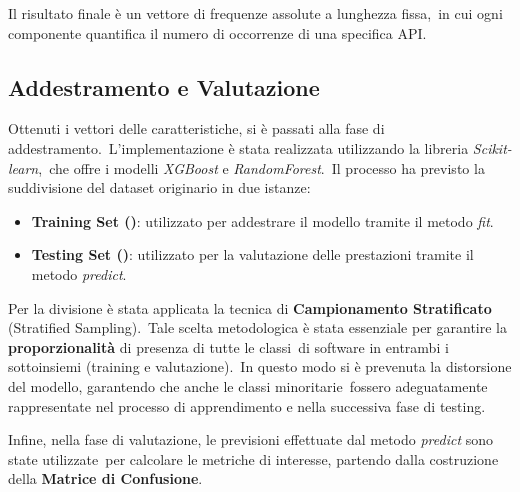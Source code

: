 Il risultato finale è un vettore di frequenze assolute a lunghezza fissa,\
in cui ogni componente quantifica il numero di occorrenze di una specifica API.

\subsection{Addestramento e Valutazione}

Ottenuti i vettori delle caratteristiche, si è passati alla fase di addestramento.\
L'implementazione è stata realizzata utilizzando la libreria \textit{Scikit-learn},\
che offre i modelli \textit{XGBoost} e \textit{RandomForest}.\
Il processo ha previsto la suddivisione del dataset originario in due istanze:
\begin{itemize}
    \item \textbf{Training Set (\percc{80})}: utilizzato per addestrare il modello tramite il metodo \textit{fit}.
    \item \textbf{Testing Set (\percc{20})}: utilizzato per la valutazione delle prestazioni tramite il metodo \textit{predict}.
\end{itemize}

Per la divisione è stata applicata la tecnica di \textbf{Campionamento Stratificato} (Stratified Sampling).\
Tale scelta metodologica è stata essenziale per garantire la \textbf{proporzionalità} di presenza di tutte le classi\
di software in entrambi i sottoinsiemi (training e valutazione).\
In questo modo si è prevenuta la distorsione del modello, garantendo che anche le classi minoritarie\
fossero adeguatamente rappresentate nel processo di apprendimento e nella successiva fase di testing.

Infine, nella fase di valutazione, le previsioni effettuate dal metodo \textit{predict} sono state utilizzate\
per calcolare le metriche di interesse, partendo dalla costruzione della \textbf{Matrice di Confusione}.